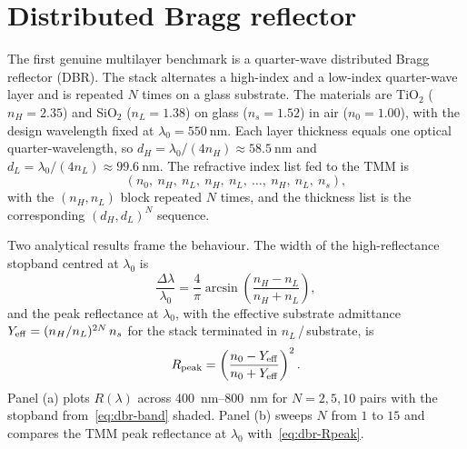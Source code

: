 \section{Distributed Bragg reflector}

The first genuine multilayer benchmark is a quarter-wave distributed
Bragg reflector (DBR). The stack alternates a high-index and a low-index
quarter-wave layer and is repeated $N$ times on a glass substrate. The
materials are TiO$_2$ ($n_H = 2.35$) and SiO$_2$ ($n_L = 1.38$) on glass
($n_s = 1.52$) in air ($n_0 = 1.00$), with the design wavelength fixed at
$\lambda_0 = \SI{550}{\nano\metre}$. Each layer thickness equals one
optical quarter-wavelength, so
$d_H = \lambda_0/(4 n_H) \approx \SI{58.5}{\nano\metre}$ and
$d_L = \lambda_0/(4 n_L) \approx \SI{99.6}{\nano\metre}$. The refractive
index list fed to the TMM is
\[
  (n_0,\ n_H,\ n_L,\ n_H,\ n_L,\ \ldots,\ n_H,\ n_L,\ n_s),
\]
with the $(n_H, n_L)$ block repeated $N$ times, and the thickness list is
the corresponding $(d_H, d_L)^{N}$ sequence.

Two analytical results frame the behaviour. The width of the high-reflectance
stopband centred at $\lambda_0$ is
\begin{equation}
  \frac{\Delta\lambda}{\lambda_0} = \frac{4}{\pi}\arcsin\!\left(\frac{n_H - n_L}{n_H + n_L}\right), \label{eq:dbr-band}
\end{equation}
and the peak reflectance at $\lambda_0$, with the effective substrate
admittance $Y_{\rm eff} = (n_H/n_L)^{2N}\,n_s$ for the stack terminated in
$n_L$\,/\,substrate, is
\begin{equation}
  R_{\rm peak} = \left(\frac{n_0 - Y_{\rm eff}}{n_0 + Y_{\rm eff}}\right)^{2}. \label{eq:dbr-Rpeak}
\end{equation}
Panel (a) plots $R(\lambda)$ across \SIrange{400}{800}{\nano\metre} for
$N = 2, 5, 10$ pairs with the stopband from~\eqref{eq:dbr-band} shaded.
Panel (b) sweeps $N$ from $1$ to $15$ and compares the TMM peak reflectance
at $\lambda_0$ with~\eqref{eq:dbr-Rpeak}.

\begin{center}
\end{center}


